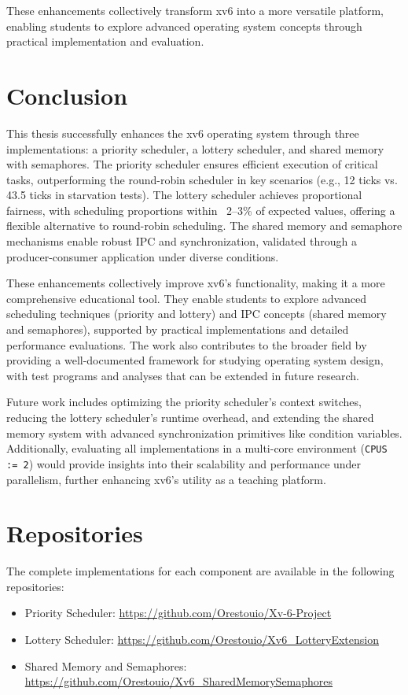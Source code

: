 \documentclass[12pt]{article}
\begin{document}
These enhancements collectively transform xv6 into a more versatile platform, enabling students to explore advanced operating system concepts through practical implementation and evaluation.

\section{Conclusion}
\label{sec:conclusion}

This thesis successfully enhances the xv6 operating system through three implementations: a priority scheduler, a lottery scheduler, and shared memory with semaphores. The priority scheduler ensures efficient execution of critical tasks, outperforming the round-robin scheduler in key scenarios (e.g., 12 ticks vs. 43.5 ticks in starvation tests). The lottery scheduler achieves proportional fairness, with scheduling proportions within ~2–3\% of expected values, offering a flexible alternative to round-robin scheduling. The shared memory and semaphore mechanisms enable robust IPC and synchronization, validated through a producer-consumer application under diverse conditions.

These enhancements collectively improve xv6’s functionality, making it a more comprehensive educational tool. They enable students to explore advanced scheduling techniques (priority and lottery) and IPC concepts (shared memory and semaphores), supported by practical implementations and detailed performance evaluations. The work also contributes to the broader field by providing a well-documented framework for studying operating system design, with test programs and analyses that can be extended in future research.

Future work includes optimizing the priority scheduler’s context switches, reducing the lottery scheduler’s runtime overhead, and extending the shared memory system with advanced synchronization primitives like condition variables. Additionally, evaluating all implementations in a multi-core environment (\texttt{CPUS := 2}) would provide insights into their scalability and performance under parallelism, further enhancing xv6’s utility as a teaching platform.

\section{Repositories}
\label{sec:repositories}

The complete implementations for each component are available in the following repositories:
\begin{itemize}
    \item Priority Scheduler: \url{https://github.com/Orestouio/Xv-6-Project}
    \item Lottery Scheduler: \url{https://github.com/Orestouio/Xv6_LotteryExtension}
    \item Shared Memory and Semaphores: \url{https://github.com/Orestouio/Xv6_SharedMemorySemaphores}
\end{itemize}
\end{document}
